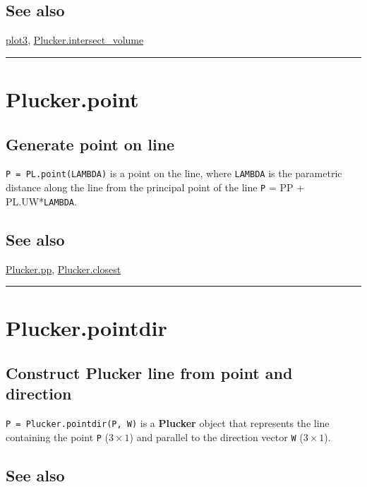 \subsection*{See also}


\hyperlink{plot3}{\color{blue} plot3}, \hyperlink{Plucker.intersect_volume}{\color{blue} Plucker.intersect\_volume}

\vspace{1.5ex}\hrule

\hypertarget{Plucker.point}{\section*{Plucker.point}}
\subsection*{Generate point on line}


\texttt{P = PL.point(LAMBDA)} is a point on the line, where \texttt{LAMBDA} is the parametric
distance along the line from the principal point of the line \texttt{P} = PP + PL.UW*\texttt{LAMBDA}.


\subsection*{See also}


\hyperlink{Plucker.pp}{\color{blue} Plucker.pp}, \hyperlink{Plucker.closest}{\color{blue} Plucker.closest}

\vspace{1.5ex}\hrule

\hypertarget{Plucker.pointdir}{\section*{Plucker.pointdir}}
\subsection*{Construct Plucker line from point and direction}


\texttt{P = Plucker.pointdir(P, W)} is a \textbf{\color{red} Plucker} object that represents the
line containing the point \texttt{P} ($3 \times 1$) and parallel to the direction vector \texttt{W} ($3 \times 1$).


\subsection*{See also}


